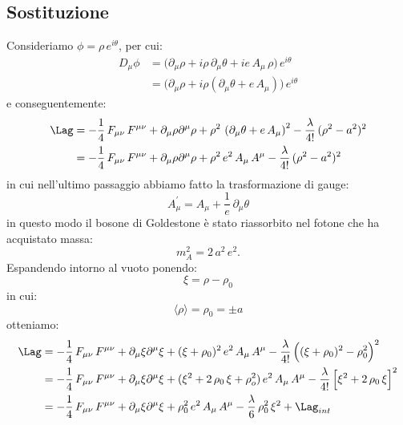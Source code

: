 \subsection{Sostituzione}

Consideriamo $\phi = \rho\, e^{i\theta}$, per cui:
\begin{align}
    D_\mu\phi &= \Big( \partial_\mu\rho + i\rho\, \partial_\mu\theta + ie\, A_\mu\, \rho \Big)\, e^{i\theta} \\
    &= \Big( \partial_\mu\rho + i\rho(\partial_\mu\theta + e\, A_\mu) \Big)\, e^{i\theta}
\end{align}
e conseguentemente:
\begin{align}
    \Lag &= -\frac{1}{4}\, F_{\mu\nu}\, F^{\mu\nu} + \partial_\mu\rho\partial^\mu\rho + \rho^2\, \left(\partial_\mu\theta + e\, A_\mu\right)^2 - \frac{\lambda}{4!}\, (\rho^2 - a^2)^2 \\
    &= -\frac{1}{4}\, F_{\mu\nu}\, F^{\mu\nu} + \partial_\mu\rho\partial^\mu\rho + \rho^2\, e^2\, A_\mu\, A^\mu - \frac{\lambda}{4!}\, (\rho^2 - a^2)^2
\end{align}
in cui nell'ultimo passaggio abbiamo fatto la trasformazione di gauge:
\begin{equation}
    A_\mu^\prime = A_\mu + \frac{1}{e}\, \partial_\mu\theta
\end{equation}
in questo modo il bosone di Goldestone è stato riassorbito nel fotone che ha acquistato massa:
\begin{equation}
    m_A^2 = 2\, a^2\, e^2.
\end{equation}
Espandendo intorno al vuoto ponendo:
\begin{equation}
    \xi = \rho - \rho_0
\end{equation}
in cui:
\begin{equation}
    \langle\rho\rangle = \rho_0 = \pm a
\end{equation}
otteniamo:
\begin{align}
    \Lag &= -\frac{1}{4}\, F_{\mu\nu}\, F^{\mu\nu} + \partial_\mu\xi\partial^\mu\xi + (\xi + \rho_0)^2\, e^2\, A_\mu\, A^\mu - \frac{\lambda}{4!}\, \Big( (\xi + \rho_0)^2 - \rho_0^2 \Big)^2 \\
    &= -\frac{1}{4}\, F_{\mu\nu}\, F^{\mu\nu} + \partial_\mu\xi\partial^\mu\xi + (\xi^2 + 2\, \rho_0\, \xi + \rho_o^2)\, e^2\, A_\mu\, A^\mu - \frac{\lambda}{4!}\, \Big[ \xi^2 + 2\, \rho_0\, \xi \Big]^2 \\
    &= -\frac{1}{4}\, F_{\mu\nu}\, F^{\mu\nu} + \partial_\mu\xi\partial^\mu\xi + \rho_0^2\, e^2\, A_\mu\, A^\mu - \frac{\lambda}{6}\, \rho_0^2\, \xi^2 + \Lag_{int}
\end{align}
